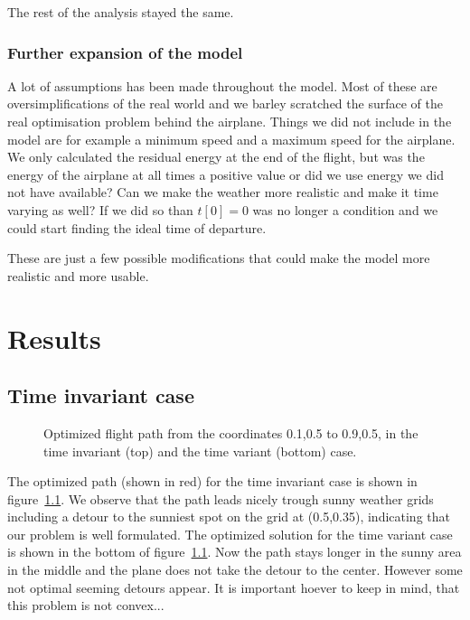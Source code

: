 \documentclass[ twoside,openright,titlepage,numbers=noenddot,headinclude,%
                footinclude=true,cleardoublepage=empty,abstractoff, %
                BCOR=5mm,paper=a4,fontsize=11pt,%
                ngerman,american,%
                ]{scrreprt}
\begin{document}
The rest of the analysis stayed the same.


\subsection{Further expansion of the model}

A lot of assumptions has been made throughout the model.
Most of these are oversimplifications of the real world and we barley scratched the surface of the real optimisation problem behind the airplane.
Things we did not include in the model are for example a minimum speed and a maximum speed for the airplane.
We only calculated the residual energy at the end of the flight, but was the energy of the airplane at all times a positive value or did we use energy we did not have available?
Can we make the weather more realistic and make it time varying as well? If we did so than $ t[0] =0 $ was no longer a condition and we could start finding the ideal time of departure.

These are just a few possible modifications that could make the model more realistic and more usable.






\chapter{Results}
\section{Time invariant case}
\begin{figure}


\caption{Optimized flight path from the coordinates 0.1,0.5 to 0.9,0.5, in the time invariant (top) and the time variant (bottom) case.}
\label{fig:path}
\end{figure}
The optimized path (shown in red) for the time invariant case is shown in figure~\ref{fig:path}. We observe that the path leads nicely trough sunny weather grids including a detour to the sunniest spot on the grid at (0.5,0.35), indicating that our problem is well formulated. The optimized solution for the time variant case is shown in the bottom of figure~\ref{fig:path}. Now the path stays longer in the sunny area in the middle and the plane does not take the detour to the center. However some not optimal seeming detours appear. It is important hoever to keep in mind, that this problem is not convex... 
\end{document}
